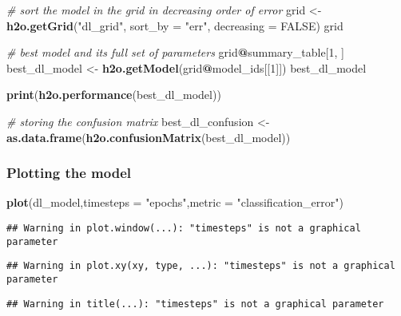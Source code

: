 \documentclass[]{article}
\newenvironment{Shaded}{\begin{snugshade}}{\end{snugshade}}
\newcommand{\KeywordTok}[1]{\textcolor[rgb]{0.13,0.29,0.53}{\textbf{#1}}}
\newcommand{\DataTypeTok}[1]{\textcolor[rgb]{0.13,0.29,0.53}{#1}}
\newcommand{\DecValTok}[1]{\textcolor[rgb]{0.00,0.00,0.81}{#1}}
\newcommand{\StringTok}[1]{\textcolor[rgb]{0.31,0.60,0.02}{#1}}
\newcommand{\CommentTok}[1]{\textcolor[rgb]{0.56,0.35,0.01}{\textit{#1}}}
\newcommand{\OtherTok}[1]{\textcolor[rgb]{0.56,0.35,0.01}{#1}}
\newcommand{\OperatorTok}[1]{\textcolor[rgb]{0.81,0.36,0.00}{\textbf{#1}}}
\newcommand{\NormalTok}[1]{#1}
\begin{document}
\begin{Shaded}
\begin{Highlighting}[]
\CommentTok{# sort the model in the grid in decreasing order of error}
\NormalTok{grid <-}\StringTok{ }\KeywordTok{h2o.getGrid}\NormalTok{(}\StringTok{"dl_grid"}\NormalTok{, }\DataTypeTok{sort_by =} \StringTok{"err"}\NormalTok{, }\DataTypeTok{decreasing =} \OtherTok{FALSE}\NormalTok{)}
\NormalTok{grid}

\CommentTok{# best model and its full set of parameters}
\NormalTok{grid}\OperatorTok{@}\NormalTok{summary_table[}\DecValTok{1}\NormalTok{, ]}
\NormalTok{best_dl_model <-}\StringTok{ }\KeywordTok{h2o.getModel}\NormalTok{(grid}\OperatorTok{@}\NormalTok{model_ids[[}\DecValTok{1}\NormalTok{]])}
\NormalTok{best_dl_model}

\KeywordTok{print}\NormalTok{(}\KeywordTok{h2o.performance}\NormalTok{(best_dl_model))}

\CommentTok{# storing the confusion matrix}
\NormalTok{best_dl_confusion <-}\StringTok{ }\KeywordTok{as.data.frame}\NormalTok{(}\KeywordTok{h2o.confusionMatrix}\NormalTok{(best_dl_model))}
\end{Highlighting}
\end{Shaded}

\subsubsection{Plotting the model}\label{plotting-the-model}

\begin{Shaded}
\begin{Highlighting}[]
\KeywordTok{plot}\NormalTok{(dl_model,}\DataTypeTok{timesteps =} \StringTok{"epochs"}\NormalTok{,}\DataTypeTok{metric =} \StringTok{"classification_error"}\NormalTok{)}
\end{Highlighting}
\end{Shaded}

\begin{verbatim}
## Warning in plot.window(...): "timesteps" is not a graphical parameter
\end{verbatim}

\begin{verbatim}
## Warning in plot.xy(xy, type, ...): "timesteps" is not a graphical parameter
\end{verbatim}

\begin{verbatim}
## Warning in title(...): "timesteps" is not a graphical parameter
\end{verbatim}
\end{document}
